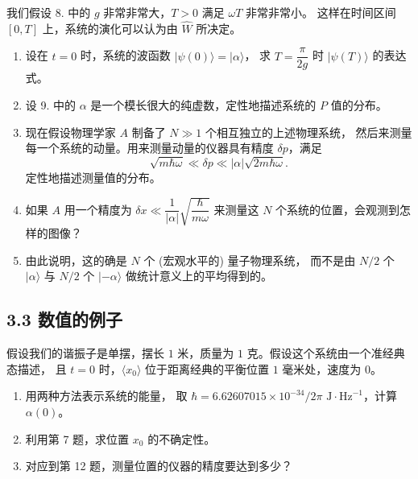 我们假设 8. 中的 $g$ 非常非常大，$T > 0$ 满足 $\omega T$ 非常非常小。
这样在时间区间 $[0, T]$ 上，系统的演化可以认为由 $\hat{W}$ 所决定。
\begin{enumerate}
    \item[9.] 设在 $t = 0$ 时，系统的波函数 $|\psi(0)\rangle = |\alpha\rangle$，
    求 $T = \dfrac{\pi}{2g}$ 时 $|\psi(T)\rangle$ 的表达式。
    
    \item[10.] 设 9. 中的 $\alpha$ 是一个模长很大的纯虚数，定性地描述系统的 $P$ 值的分布。
    
    \item[11.] 现在假设物理学家 $A$ 制备了 $N \gg 1$ 个相互独立的上述物理系统，
    然后来测量每一个系统的动量。用来测量动量的仪器具有精度 $\delta p$，满足
    \[\sqrt{m\hbar\omega} \ll \delta p \ll |\alpha| \sqrt{2m\hbar\omega}.\]
    定性地描述测量值的分布。
    
    \item[12.] 如果 $A$ 用一个精度为 $\delta x \ll \dfrac{1}{|\alpha|} \sqrt{\dfrac{\hbar}{m\omega}}$ 来测量这 $N$ 个系统的位置，会观测到怎样的图像？
    
    \item[13.] 由此说明，这的确是 $N$ 个 (宏观水平的) 量子物理系统，
    而不是由 $N/2$ 个 $|\alpha\rangle$ 与 $N/2$ 个 $|-\alpha\rangle$ 做统计意义上的平均得到的。
\end{enumerate}

\subsection*{3.3 数值的例子}

\quad 假设我们的谐振子是单摆，摆长 $1$ 米，质量为 $1$ 克。假设这个系统由一个准经典态描述，
且 $t = 0$ 时，$\langle x_0 \rangle$ 位于距离经典的平衡位置 $1$ 毫米处，速度为 $0$。

\begin{enumerate}[13]
    \item[14.] 用两种方法表示系统的能量，
    取 $\hbar = 6.62607015 \times 10^{-34}/2\pi \text{ J} \cdot \text{Hz}^{-1}$，计算 $\alpha(0)$。
    \item[15.] 利用第 7 题，求位置 $x_0$ 的不确定性。
    \item[16.] 对应到第 12 题，测量位置的仪器的精度要达到多少？
\end{enumerate}